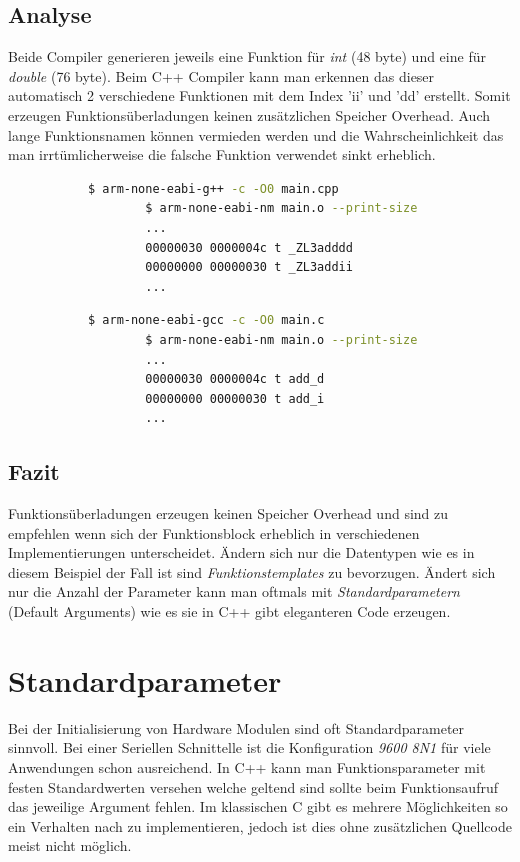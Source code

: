 \documentclass[MES,Master,ngerman]{twbook}%
\begin{document}
\subsection{Analyse}
Beide Compiler generieren jeweils eine Funktion für \textit{int} (48 byte) und eine für \textit{double} (76 byte). Beim C++ Compiler kann man erkennen das dieser automatisch 2 verschiedene Funktionen mit dem Index 'ii' und 'dd' erstellt. Somit erzeugen Funktionsüberladungen keinen zusätzlichen Speicher Overhead. Auch lange Funktionsnamen können vermieden werden und die Wahrscheinlichkeit das man irrtümlicherweise die falsche Funktion verwendet sinkt erheblich.
\begin{figure}[!htb]
	\begin{subfigure}[b]{0.5\textwidth}
		\begin{lstlisting}[gobble=6, title={Analyse C++}, language=bash, numbers=none]
		$ arm-none-eabi-g++ -c -O0 main.cpp
		$ arm-none-eabi-nm main.o --print-size
		...
		00000030 0000004c t _ZL3adddd
		00000000 00000030 t _ZL3addii
		...
		\end{lstlisting}
	\end{subfigure}
	\begin{subfigure}[b]{0.5\textwidth}
		\begin{lstlisting}[gobble=6, title={Analyse C}, language=bash, numbers=none]
		$ arm-none-eabi-gcc -c -O0 main.c
		$ arm-none-eabi-nm main.o --print-size
		...
		00000030 0000004c t add_d
		00000000 00000030 t add_i
		...
		\end{lstlisting}
	\end{subfigure}
\end{figure}

\subsection{Fazit}
Funktionsüberladungen erzeugen keinen Speicher Overhead und sind zu empfehlen wenn sich der Funktionsblock erheblich in verschiedenen Implementierungen unterscheidet. Ändern sich nur die Datentypen wie es in diesem Beispiel der Fall ist sind \textit{Funktionstemplates} zu bevorzugen. Ändert sich nur die Anzahl der Parameter kann man oftmals mit \textit{Standardparametern} (Default Arguments) wie es sie in C++ gibt eleganteren Code erzeugen.

\newpage
\section{Standardparameter}
Bei der Initialisierung von Hardware Modulen sind oft Standardparameter sinnvoll. Bei einer Seriellen Schnittelle ist die Konfiguration \textit{9600 8N1} für viele Anwendungen schon ausreichend. In C++ kann man Funktionsparameter mit festen Standardwerten versehen welche geltend sind sollte beim Funktionsaufruf das jeweilige Argument fehlen. Im klassischen C gibt es mehrere Möglichkeiten so ein Verhalten nach zu implementieren, jedoch ist dies ohne zusätzlichen Quellcode meist nicht möglich.
\end{document}
